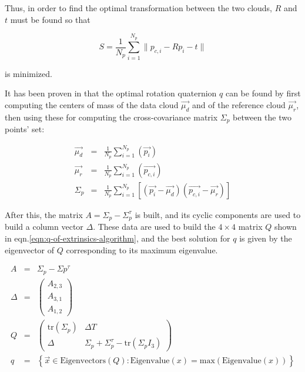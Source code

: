 Thus, in order to find the optimal transformation between the two clouds, $R$
and $t$ must be found so that

\begin{equation}
  S=\frac{1}{N_p}\sum_{i=1}^{N_p}\lVert p_{c,i} - Rp_i -t  \rVert
\end{equation}

is minimized.

It has been proven in \cite{extrinsics-algorithm}that the optimal rotation
quaternion $q$ can be found by first computing the centers of mass of the data
cloud $\vec{\mu_d}$ and of the reference cloud $\vec{\mu_r}$, then using these for
computing the cross-covariance matrix $\Sigma_{p}$ between the two points' set:

\begin{eqnarray}
  \vec{\mu_d} & = &  \frac{1}{N_p}\sum_{i=1}^{N_p}\left(\vec{p_i}\right) \\
  \vec{\mu_r} & = &  \frac{1}{N_p}\sum_{i=1}^{N_p}\left(\vec{p_{c,i}}\right) \\
  \Sigma_{p} & = &
  \frac{1}{N_p}\sum_{i=1}^{N_p}\left[\left(\vec{p_i}-\vec{\mu_d}\right)\left(\vec{p_{c,i}}-\vec{\mu_r}\right)\right]
\end{eqnarray}

After this, the matrix $A=\Sigma_{p}-\Sigma_{p}^{\tau}$ is built, and its cyclic
components are used to build a column vector $\Delta$. These data are used to
build the $4 \times 4$ matrix $Q$ shown in
eqn.\ref{eqn:q-of-extrinsics-algorithm}, and the best solution for $q$ is given
by the eigenvector of $Q$ corresponding to its maximum eigenvalue.

\begin{eqnarray}
  A & = & \Sigma_{p}-\Sigma{p}^{\tau} \\
\Delta & = & \begin{pmatrix}A_{2,3}\\A_{3,1}\\A_{1,2}\end{pmatrix} \\
  Q & = & \begin{pmatrix}
  \text{tr}(\Sigma_{p}) & \Delta T \\
  \Delta & \Sigma_{p}+\Sigma_{p}^{\tau}-\text{tr}(\Sigma_{p}I_{3}) 
\end{pmatrix} \label{eqn:q-of-extrinsics-algorithm}\\
q & = & \left\{ \vec{x} \in \text{Eigenvectors}(Q) :
  \text{Eigenvalue}(x)=\text{max}\left(\text{Eigenvalue}(x)\right) \right\}
\end{eqnarray}


